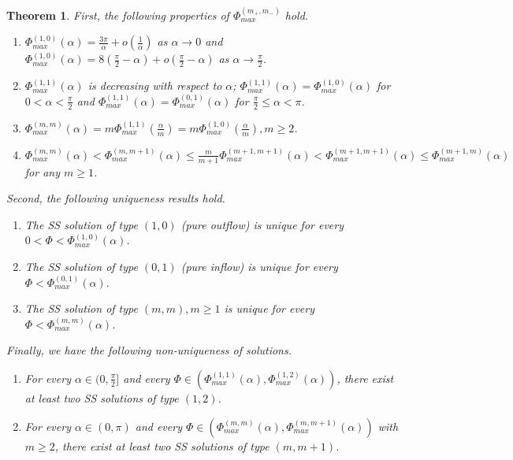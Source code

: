 \documentclass[reqno,12pt]{amsart}
\newtheorem{theorem}{Theorem}[section]
\begin{document}
\begin{theorem}
    \label{main2_2}
    First, the following properties of $\Phi^{(m_+,m_-)}_{max}$ hold.
            \begin{enumerate}
            \item $\Phi_{max}^{(1,0)}(\alpha)=  \frac{3\pi}{\alpha} + o(\frac{1}{\alpha})$ as $\alpha\to 0$ and 
            $\Phi^{(1,0)}_{max} (\alpha) = 8\left(\frac{\pi}{2}-\alpha\right)  + o \left(\frac{\pi}{2}-\alpha \right) $ as $\alpha \to \frac{\pi}{2}$.
            
            \item $\Phi^{(1,1)}_{max} (\alpha)$ is decreasing with respect to $\alpha$;
            $\Phi^{(1,1)}_{max} (\alpha)=\Phi_{max}^{(1,0)}(\alpha)$ for $0<\alpha<\frac{\pi}{2}$ and 
            $\Phi^{(1,1)}_{max} (\alpha)=\Phi_{max}^{(0,1)}(\alpha)$ for $\frac{\pi}{2}\leq\alpha<\pi$.

            \item $\Phi_{max}^{(m,m)}(\alpha)= m \Phi_{max}^{(1,1)} ( \frac{\alpha}{m})
            = m \Phi_{max}^{(1,0)} ( \frac{\alpha}{m}), m\geq 2$.
            \item 
           
            $\Phi^{(m,m)}_{max}(\alpha) 
            < \Phi^{(m,m+1)}_{max} (\alpha)
            \leq \frac{m}{m+1} \Phi^{(m+1,m+1)}_{max} (\alpha) < \Phi_{max}^{(m+1, m+1)}(\alpha) 
            \leq \Phi_{max}^{(m+1, m)}(\alpha)$  for any $m\geq 1$.

            \end{enumerate}     
   Second, the following uniqueness results hold.
            \begin{enumerate}
            \item The SS solution of type $(1, 0)$ (pure outflow)  is unique for every $0< \Phi < \Phi_{max}^{(1, 0)}(\alpha)$. 

            \item The SS solution of type $(0, 1)$ (pure inflow) is unique for every $\Phi < \Phi_{max}^{(0, 1)}(\alpha).$
            
            \item The SS solution of type $(m, m), m\geq 1$ is unique for every $\Phi < \Phi_{max}^{(m, m)} (\alpha)$.
            \end{enumerate}
  Finally, we have the following non-uniqueness of solutions.
            \begin{enumerate}
            
            \item For every $ \alpha \in (0, \frac{\pi}{2}]$ and  every $\Phi\in (\Phi_{max}^{(1, 1)}(\alpha), \Phi_{max}^{(1, 2)}(\alpha))$, there exist at least two SS solutions of type $(1, 2)$.

            \item For every $ \alpha \in (0, \pi)$ and every $\Phi\in (\Phi_{max}^{(m, m)}(\alpha),  \Phi_{max}^{(m, m+1)} (\alpha))$ with $m\geq 2$, there exist at least two SS solutions of type $(m, m+1)$. 
            \end{enumerate}
    \end{theorem}
\end{document}
